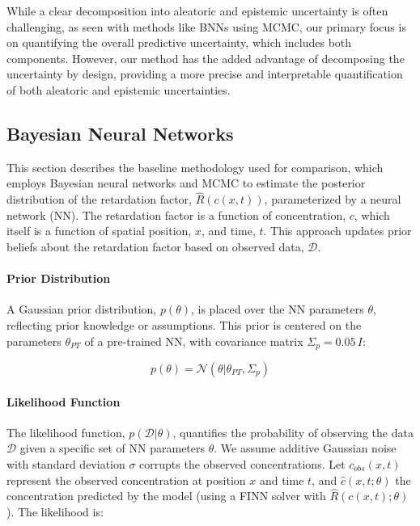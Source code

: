 While a clear decomposition into aleatoric and epistemic uncertainty is often challenging, as seen with methods like BNNs using MCMC, our primary focus is on quantifying the overall predictive uncertainty, which includes both components. However, our method has the added advantage of decomposing the uncertainty by design, providing a more precise and interpretable quantification of both aleatoric and epistemic uncertainties.





\subsection{Bayesian Neural Networks}
\label{sec:bayes_nn}
This section describes the baseline methodology used for comparison, which employs Bayesian neural networks and MCMC to estimate the posterior distribution of the retardation factor, $\hat{R}(c(x,t))$, parameterized by a neural network (NN). The retardation factor is a function of concentration, $c$, which itself is a function of spatial position, $x$, and time, $t$. This approach updates prior beliefs about the retardation factor based on observed data, $\mathcal{D}$.

\paragraph{Prior Distribution}

A Gaussian prior distribution, $p(\theta)$, is placed over the NN parameters $\theta$, reflecting prior knowledge or assumptions. This prior is centered on the parameters $\theta_{PT}$ of a pre-trained NN, with covariance matrix $\Sigma_p = 0.05 \, I$:


\begin{equation*}
p(\theta) = \mathcal{N}(\theta | \theta_{PT}, \Sigma_p)
\end{equation*}

\paragraph{Likelihood Function}

The likelihood function, $p(\mathcal{D} | \theta)$, quantifies the probability of observing the data $\mathcal{D}$ given a specific set of NN parameters $\theta$. We assume additive Gaussian noise with standard deviation $\sigma$ corrupts the observed concentrations. Let $c_{obs}(x,t)$ represent the observed concentration at position $x$ and time $t$, and $\hat{c}(x,t; \theta)$ the concentration predicted by the model (using a FINN solver with $\hat{R}(c(x,t);\theta)$). The likelihood is:

